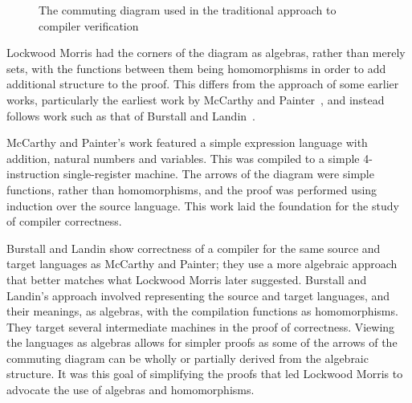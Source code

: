 \documentclass[a4paper,10pt]{report}
\begin{document}
\begin{figure}[ht]
  \begin{center}
  \end{center}
  \caption{The commuting diagram used in the traditional approach to
    compiler verification}
  \label{commuting-diagram}
\end{figure}

Lockwood Morris had the corners of the diagram as algebras, rather
than merely sets, with the functions between them being homomorphisms
in order to add additional structure to the proof.
This differs from the approach of some earlier works, particularly the
earliest work by McCarthy and Painter~\cite{mccarthy1967}, and instead
follows work such as that of Burstall and Landin~\cite{burstall1969}.

McCarthy and Painter's work featured a simple expression language with
addition, natural numbers and variables.
This was compiled to a simple 4-instruction single-register machine.
The arrows of the diagram were simple functions, rather than
homomorphisms, and the proof was performed using induction over the
source language.
This work laid the foundation for the study of compiler correctness.

Burstall and Landin show correctness of a compiler for the same source
and target languages as McCarthy and Painter; they use a more
algebraic approach that better matches what Lockwood Morris later
suggested.
Burstall and Landin's approach involved representing the source and
target languages, and their meanings, as algebras, with the
compilation functions as homomorphisms.
They target several intermediate machines in the proof of correctness.
Viewing the languages as algebras allows for simpler proofs as some of
the arrows of the commuting diagram can be wholly or partially derived
from the algebraic structure.
It was this goal of simplifying the proofs that led Lockwood Morris to
advocate the use of algebras and homomorphisms.
\end{document}
